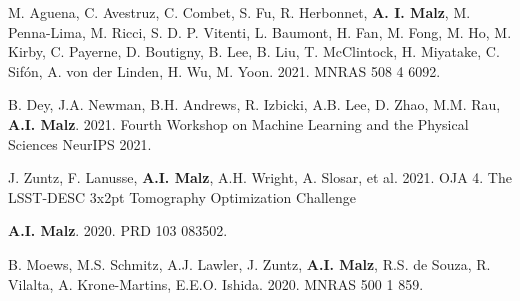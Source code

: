 \begin{list}{\pubnumber{\therefpubnum}}{\malzlist}
\item M. Aguena, C. Avestruz, C. Combet, S. Fu, R. Herbonnet, {\bf A. I. Malz}, M. Penna-Lima, M. Ricci, S. D. P. Vitenti, %
L. Baumont, H. Fan, M. Fong, M. Ho, M. Kirby, C. Payerne, D. Boutigny, B. Lee, B. Liu, T. McClintock, H. Miyatake, C. Sifón, A. von der Linden, H. Wu, M. Yoon. 
2021. MNRAS 508 4 6092. 
	
\item B. Dey, J.A. Newman, B.H. Andrews, R. Izbicki, A.B. Lee, D. Zhao, M.M. Rau, {\bf A.I. Malz}. 
2021. Fourth Workshop on Machine Learning and the Physical Sciences NeurIPS 2021. 

\item J. Zuntz, F. Lanusse, \textbf{A.I. Malz}, A.H. Wright, A. Slosar, et al. 2021. OJA 4.  {The LSST-DESC 3x2pt Tomography Optimization Challenge}

\item {\bf A.I. Malz}. 2020. PRD 103 083502. 
	

\item B. Moews, M.S. Schmitz, A.J. Lawler, J. Zuntz, {\bf A.I. Malz}, R.S. de Souza, R. Vilalta, A. Krone-Martins, E.E.O. Ishida. 2020. MNRAS 500 1 859. 
  

\end{list}
